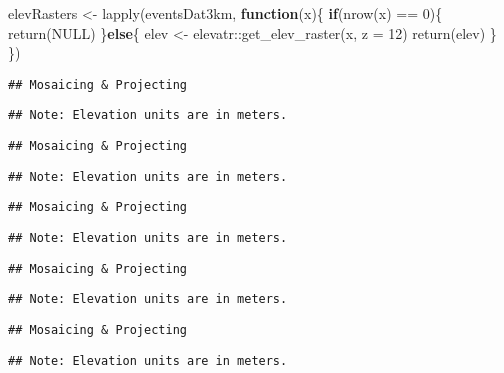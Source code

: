 \documentclass[
]{article}
\newenvironment{Shaded}{\begin{snugshade}}{\end{snugshade}}
\newcommand{\AttributeTok}[1]{\textcolor[rgb]{0.77,0.63,0.00}{#1}}
\newcommand{\ConstantTok}[1]{\textcolor[rgb]{0.00,0.00,0.00}{#1}}
\newcommand{\ControlFlowTok}[1]{\textcolor[rgb]{0.13,0.29,0.53}{\textbf{#1}}}
\newcommand{\DecValTok}[1]{\textcolor[rgb]{0.00,0.00,0.81}{#1}}
\newcommand{\FunctionTok}[1]{\textcolor[rgb]{0.00,0.00,0.00}{#1}}
\newcommand{\NormalTok}[1]{#1}
\newcommand{\OtherTok}[1]{\textcolor[rgb]{0.56,0.35,0.01}{#1}}
\newcommand{\SpecialCharTok}[1]{\textcolor[rgb]{0.00,0.00,0.00}{#1}}
\begin{document}
\begin{Shaded}
\begin{Highlighting}[]
\NormalTok{elevRasters }\OtherTok{\textless{}{-}} \FunctionTok{lapply}\NormalTok{(eventsDat3km, }\ControlFlowTok{function}\NormalTok{(x)\{}
  \ControlFlowTok{if}\NormalTok{(}\FunctionTok{nrow}\NormalTok{(x) }\SpecialCharTok{==} \DecValTok{0}\NormalTok{)\{}
    \FunctionTok{return}\NormalTok{(}\ConstantTok{NULL}\NormalTok{)}
\NormalTok{  \}}\ControlFlowTok{else}\NormalTok{\{}
\NormalTok{    elev }\OtherTok{\textless{}{-}}\NormalTok{ elevatr}\SpecialCharTok{::}\FunctionTok{get\_elev\_raster}\NormalTok{(x, }\AttributeTok{z =} \DecValTok{12}\NormalTok{)}
    \FunctionTok{return}\NormalTok{(elev)}
\NormalTok{  \}}
\NormalTok{\})}
\end{Highlighting}
\end{Shaded}

\begin{verbatim}
## Mosaicing & Projecting
\end{verbatim}

\begin{verbatim}
## Note: Elevation units are in meters.
\end{verbatim}

\begin{verbatim}
## Mosaicing & Projecting
\end{verbatim}

\begin{verbatim}
## Note: Elevation units are in meters.
\end{verbatim}

\begin{verbatim}
## Mosaicing & Projecting
\end{verbatim}

\begin{verbatim}
## Note: Elevation units are in meters.
\end{verbatim}

\begin{verbatim}
## Mosaicing & Projecting
\end{verbatim}

\begin{verbatim}
## Note: Elevation units are in meters.
\end{verbatim}

\begin{verbatim}
## Mosaicing & Projecting
\end{verbatim}

\begin{verbatim}
## Note: Elevation units are in meters.
\end{verbatim}
\end{document}
